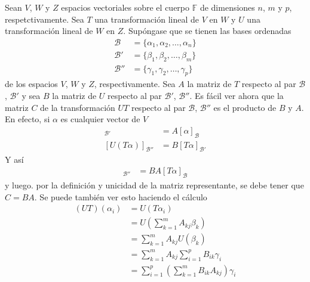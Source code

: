 \newpage
Sean $V$, $W$ y $Z$ espacios vectoriales sobre el cuerpo $\mathbb{F}$ de
dimensiones $n$, $m$ y $p$, respetctivamente.
Sea $T$ una transformación lineal de $V$ en $W$ y $U$ una transformación
lineal de $W$ en $Z$. Supóngase que se tienen las bases ordenadas
\begin{align*}
    \mathcal{B}   &= \{\alpha_{1}, \alpha_{2}, \dots , \alpha_{n}\}\\
    \mathcal{B}'  &= \{\beta_{1}, \beta_{2}, \dots ,\beta_{m}\}\\
    \mathcal{B}'' &= \{\gamma_{1}, \gamma_{2}, \dots ,\gamma_{p}\}
\end{align*}
de los espacios $V$, $W$ y $Z$, respectivamente. Sea $A$ la matriz de $T$
respecto al par $\mathcal{B}$, $\mathcal{B}'$ y sea $B$ la matriz de $U$ 
respecto al par $\mathcal{B}'$, $\mathcal{B}''$. Es fácil ver ahora que la
matriz $C$ de la transformación $UT$ respecto al par $\mathcal{B}$, $\mathcal{B}''$ 
es el producto de $B$ y $A$. En efecto, si $\alpha$ es cualquier vector de $V$
\begin{align*}
    [T\alpha]_{\mathcal{B}'}&=A[\alpha]_{\mathcal{B}}\\
    [U(T\alpha)]_{\mathcal{B}''}&=B[T\alpha]_{\mathcal{B}'}
\end{align*}
Y así
\begin{align*}
    [(UT)(\alpha)]_{\mathcal{B}''}&=BA[T\alpha]_{\mathcal{B}}
\end{align*}
y luego. por la deﬁnición y unicidad de la matriz representante, se debe tener
que $C = BA$. Se puede también ver esto haciendo el cálculo
\begin{align*}
    (UT)(\alpha_{i})&=U(T\alpha_{i}) \\
    &=U\left (\sum_{k=1}^{m}A_{kj}\beta_{k}\right ) \\
    &=\sum_{k=1}^{m}A_{kj}U(\beta_{k}) \\
    &=\sum_{k=1}^{m}A_{kj}\sum_{i=1}^{p}B_{ik}\gamma_{i}\\
    &=\sum_{i=1}^{p} \left (\sum_{k=1}^{m}B_{ik}A_{kj}\right )\gamma_{i}
\end{align*}

